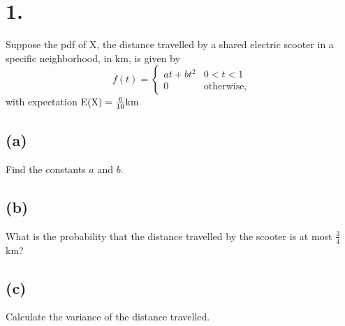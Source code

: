 \documentclass{article}
\begin{document}
\thispagestyle{firstpageheader}

\section*{1.}
{\Large 

Suppose the pdf of X, the distance travelled by a shared electric scooter in a specific neighborhood, in km, is given by  
\[f(t)=\begin{cases}at+bt^2& 0<t<1\\0& \text{otherwise,}  \end{cases}\]
with expectation $\rm E(X)=\frac 6{10} km$

\subsection*{(a)}
Find the constants $a$ and $b$. \\ 

\subsection*{(b)}
What is the probability that the distance travelled by the  scooter is at most $\frac34$ km?

\subsection*{(c)}
Calculate the variance of the distance travelled.

}
\end{document}
